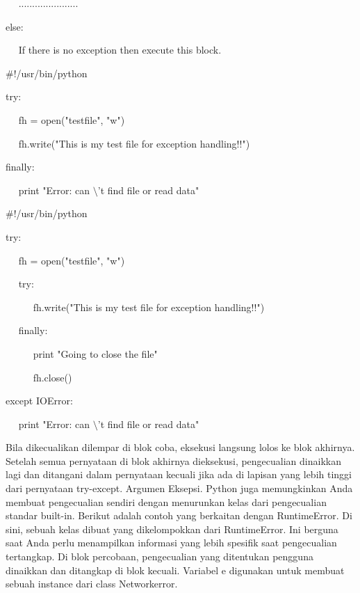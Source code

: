 \noindent 
~~ ...................... \par
\noindent 
else: \par
\noindent 
~~ If there is no exception then execute this block.  \par
\vspace{12pt}
\vspace{12pt}
\noindent 
 $  \#  $!/usr/bin/python \par
\vspace{12pt}
\noindent 
try: \par
\noindent 
~~ fh = open("testfile", "w") \par
\noindent 
~~ fh.write("This is my test file for exception handling!!") \par
\noindent 
finally: \par
\noindent 
~~ print "Error: can $  \setminus  $'t find file or read data" \par
\vspace{12pt}
\vspace{12pt}
\noindent 
 $  \#  $!/usr/bin/python \par
\vspace{12pt}
\noindent 
try: \par
\noindent 
~~ fh = open("testfile", "w") \par
\noindent 
~~ try: \par
\noindent 
~~~~~ fh.write("This is my test file for exception handling!!") \par
\noindent 
~~ finally: \par
\noindent 
~~~~~ print "Going to close the file" \par
\noindent 
~~~~~ fh.close() \par
\noindent 
except IOError: \par
\noindent 
~~ print "Error: can $  \setminus  $'t find file or read data" \par
\vspace{12pt}
\vspace{12pt}
\vspace{12pt}
\vspace{12pt}
Bila dikecualikan dilempar di blok coba, eksekusi langsung lolos ke blok akhirnya. Setelah semua pernyataan di blok akhirnya dieksekusi, pengecualian dinaikkan lagi dan ditangani dalam pernyataan kecuali jika ada di lapisan yang lebih tinggi dari pernyataan try-except. Argumen Eksepsi. Python juga memungkinkan Anda membuat pengecualian sendiri dengan menurunkan kelas dari pengecualian standar built-in. Berikut adalah contoh yang berkaitan dengan RuntimeError. Di sini, sebuah kelas dibuat yang dikelompokkan dari RuntimeError. Ini berguna saat Anda perlu menampilkan informasi yang lebih spesifik saat pengecualian tertangkap. Di blok percobaan, pengecualian yang ditentukan pengguna dinaikkan dan ditangkap di blok kecuali. Variabel e digunakan untuk membuat sebuah instance dari class Networkerror. \par
\vspace{18pt}

